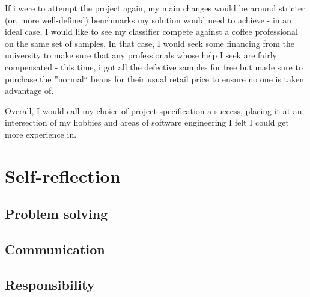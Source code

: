 \documentclass[12pt]{article}
\begin{document}
If i were to attempt the project again, my main changes would be around stricter (or, more well-defined) benchmarks my solution would need to achieve -
in an ideal case, I would like to see my classifier compete against a coffee professional on the same set of samples.
In that case, I would seek some financing from the university to make sure that any professionals whose help I seek are fairly compensated -
this time, i got all the defective samples for free but made sure to purchase the ''normal`` beans for their usual retail price to ensure no one is taken advantage of.

Overall, I would call my choice of project specification a success, placing it at an intersection of my hobbies and areas of software engineering I felt I could get more experience in.
\section{Self-reflection}
\label{sec:section-2}
    \subsection{Problem solving}
    \subsection{Communication}
    \subsection{Responsibility}
\end{document}
